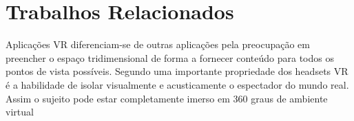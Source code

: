 \documentclass[conference]{IEEEtran}
\begin{document}
%



\section{Trabalhos Relacionados} \label{sec:relatedworks}

Aplicações VR diferenciam-se de outras aplicações pela preocupação em preencher o espaço tridimensional de forma a fornecer conteúdo para todos os pontos de vista possíveis. Segundo \cite{fuchs2017virtual} uma importante propriedade dos headsets VR é a habilidade de isolar visualmente e acusticamente o espectador do mundo real. Assim o sujeito pode estar completamente imerso em 360 graus de ambiente virtual
\end{document}
